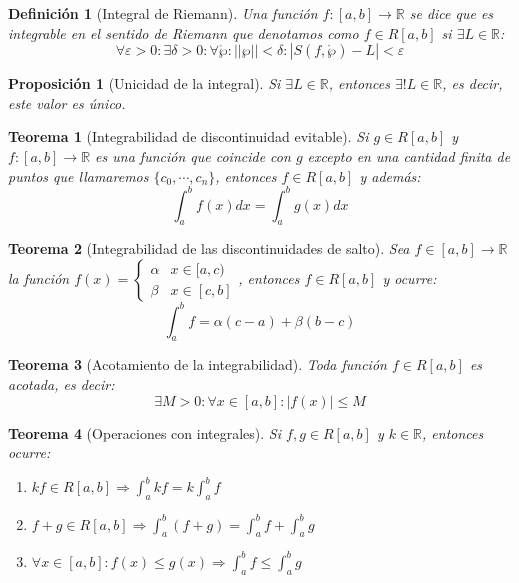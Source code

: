 \documentclass[10pt,a4paper,openright]{book}
\newtheorem{teorema}{Teorema}[chapter]
\newtheorem{proposicion}{Proposición}[chapter]
\newtheorem{definicion}{Definición}[chapter]
\begin{document}
\begin{definicion}[Integral de Riemann]
Una función $f:[a,b]\rightarrow \mathbb R$ se dice que es integrable en el sentido de Riemann que denotamos como $f\in R[a,b]$ si $\exists L\in \mathbb R$:
$$\forall \varepsilon>0: \exists \delta>0: \forall \mathring{\wp}: ||\wp||<\delta: \left|S(f,\mathring{\wp})-L\right|<\varepsilon$$
\end{definicion}

\begin{proposicion}[Unicidad de la integral]
Si $\exists L \in \mathbb R$, entonces $\exists! L\in \mathbb R$, es decir, este valor es único.
\end{proposicion}

\begin{teorema}[Integrabilidad de discontinuidad evitable]
Si $g\in R[a,b]$ y $f:[a,b]\rightarrow \mathbb R$ es una función que coincide  con $g$ excepto en una cantidad finita de puntos que llamaremos $\{c_0, \cdots, c_n\}$, entonces $f\in R[a,b]$ y además:
$$\int_{a}^bf(x)dx=\int_a^bg(x)dx$$
\end{teorema}

\begin{teorema}[Integrabilidad de las discontinuidades de salto]
Sea $f\in[a,b]\rightarrow \mathbb R$ la función $f(x)=\begin{cases}\alpha & x\in [a,c) \\ \beta & x\in [c,b]\end{cases}$, entonces $f\in R[a,b]$ y ocurre:
$$\int_a^b f = \alpha (c-a)+\beta(b-c)$$
\end{teorema}

\begin{teorema}[Acotamiento de la integrabilidad]
Toda función $f\in R[a,b]$ es acotada, es decir:
$$\exists M>0:\forall x\in [a,b] :|f(x)|\leq M$$
\end{teorema}

\begin{teorema}[Operaciones con integrales]
Si $f,g\in R[a,b]$ y $k\in \mathbb R$, entonces ocurre:
\begin{enumerate}
\item $kf\in R[a,b]\Rightarrow \int_a^b kf = k\int_a^b f$
\item $f+g\in R[a,b]\Rightarrow \int_a^b (f+g)=\int_a^b f+\int_a^b g$
\item $\forall x\in [a,b]: f(x)\leq g(x)\Rightarrow \int_a^b f \leq \int_a^b g$
\end{enumerate}
\end{teorema}
\end{document}
